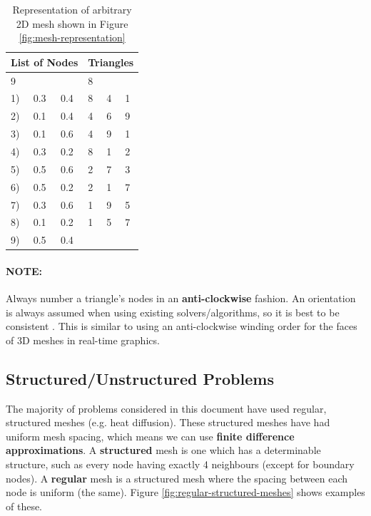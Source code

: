 \documentclass{article}
\begin{document}
\begin{table}
	\centering
	\begin{tabular}{|l|l|l|l|l|l|}
		\hline
		\multicolumn{3}{|c|}{\textbf{List of Nodes}} & \multicolumn{3}{|c|}{\textbf{Triangles}} \\
		\hline
		\multicolumn{3}{|l|}{9} & \multicolumn{3}{|l|}{8} \\		
		\hline
		1) & 0.3 & 0.4 & 8 & 4 & 1 \\
		2) & 0.1 & 0.4 & 4 & 6 & 9 \\
		3) & 0.1 & 0.6 & 4 & 9 & 1 \\
		4) & 0.3 & 0.2 & 8 & 1 & 2 \\
		5) & 0.5 & 0.6 & 2 & 7 & 3 \\
		6) & 0.5 & 0.2 & 2 & 1 & 7 \\
		7) & 0.3 & 0.6 & 1 & 9 & 5 \\
		8) & 0.1 & 0.2 & 1 & 5 & 7 \\
		9) & 0.5 & 0.4 & & & \\
		\hline
	\end{tabular}
	\caption{Representation of arbitrary 2D mesh shown in Figure \ref{fig:mesh-representation}}
	\label{tab:mesh-representation}
\end{table}

\paragraph{\textbf{NOTE:}} Always number a triangle's nodes in an \textbf{anti-clockwise} fashion. An orientation is always assumed when using existing solvers/algorithms, so it is best to be consistent . This is similar to using an anti-clockwise winding order for the faces of 3D meshes in real-time graphics.

\subsection{Structured/Unstructured Problems}
\label{sec:structured-unstructured-problems}

The majority of problems considered in this document have used regular, structured meshes (e.g. heat diffusion). These structured meshes have had uniform mesh spacing, which means we can use \textbf{finite difference approximations}. A \textbf{structured} mesh is one which has a determinable structure, such as every node having exactly 4 neighbours (except for boundary nodes). A \textbf{regular} mesh is a structured mesh where the spacing between each node is uniform (the same). Figure \ref{fig:regular-structured-meshes} shows examples of these.
\end{document}
